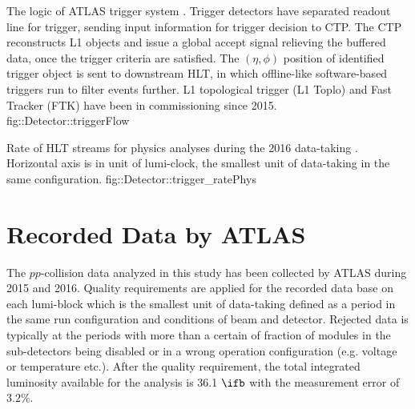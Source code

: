 
%
{The logic of ATLAS trigger system \cite{ATLASTrigger2015}. Trigger detectors have separated readout line for trigger, sending input information for trigger decision to CTP. 
The CTP reconstructs L1 objects and issue a global accept signal relieving the buffered data, once the trigger criteria are satisfied. 
The $(\eta,\phi)$ position of identified trigger object is sent to downstream HLT, in which offline-like software-based triggers run to filter events further.
L1 topological trigger (L1 Toplo) and Fast Tracker (FTK) have been in commissioning since 2015.  \\
}
{fig::Detector::triggerFlow}


\clearpage
{}
{Rate of HLT streams for physics analyses during the 2016 data-taking \cite{trigPubResult}. Horizontal axis is in unit of lumi-clock, the smallest unit of data-taking in the same configuration.}
{fig::Detector::trigger_ratePhys}


\section{Recorded Data by ATLAS}
The $pp$-collision data analyzed in this study has been collected by ATLAS during 2015 and 2016. 
Quality requirements are applied for the recorded data base on each lumi-block which is the smallest unit of data-taking defined as a period in the same run configuration and conditions of beam and detector. 
Rejected data is typically at the periods with more than a certain of fraction of modules in the sub-detectors being disabled or in a wrong operation configuration (e.g. voltage or temperature etc.).
After the quality requirement, the total integrated luminosity available for the analysis is 36.1 $\ifb$ with the measurement error of $3.2\%$. \\


